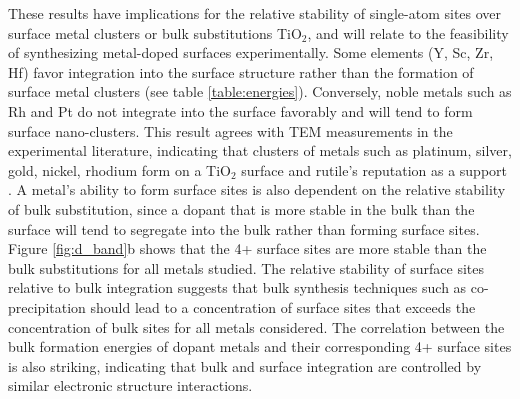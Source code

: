 
These results have implications for the relative stability of single-atom sites over surface metal clusters or bulk substitutions TiO$_2$, and will relate to the feasibility of synthesizing metal-doped surfaces experimentally. Some elements (Y, Sc, Zr, Hf) favor integration into the surface structure rather than the formation of surface metal clusters (see table \ref{table:energies}). Conversely, noble metals such as Rh and Pt do not integrate into the surface favorably and will tend to form surface nano-clusters. This result agrees with TEM measurements in the experimental literature, indicating that clusters of metals such as platinum, silver, gold, nickel, rhodium form on a TiO$_2$ surface \cite{Iliev_2006, Dung_Dang_2010, Shinde_2013, Yu_2019} and rutile's reputation as a support \cite{Bagheri_2014}. A metal's ability to form surface sites is also dependent on the relative stability of bulk substitution, since a dopant that is more stable in the bulk than the surface will tend to segregate into the bulk rather than forming surface sites. Figure \ref{fig:d_band}b shows that the 4+ surface sites are more stable than the bulk substitutions for all metals studied. The relative stability of surface sites relative to bulk integration suggests that bulk synthesis techniques such as co-precipitation should lead to a concentration of surface sites that exceeds the concentration of bulk sites for all metals considered.
The correlation between the bulk formation energies of dopant metals and their corresponding 4+ surface sites is also striking, indicating that bulk and surface integration are controlled by similar electronic structure interactions. %

